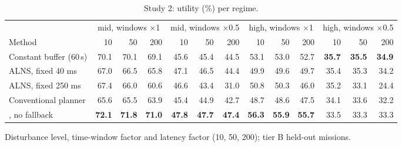 \begin{table}[t]
\caption{Study 2: utility (\%) per regime.}\label{tab:s2regime}
\centering\footnotesize
\setlength{\tabcolsep}{2.2pt}
\begin{threeparttable}
\begin{tabular}{lrrrrrrrrrrrr}
\toprule
 & \multicolumn{3}{c}{mid, windows $\times$1} & \multicolumn{3}{c}{mid, windows $\times$0.5} & \multicolumn{3}{c}{high, windows $\times$1} & \multicolumn{3}{c}{high, windows $\times$0.5} \\
\cmidrule(lr){2-4}\cmidrule(lr){5-7}\cmidrule(lr){8-10}\cmidrule(lr){11-13}
Method & 10 & 50 & 200 & 10 & 50 & 200 & 10 & 50 & 200 & 10 & 50 & 200 \\
\midrule
Constant buffer (60\,s) & 70.1 & 70.1 & 69.1 & 45.6 & 45.4 & 44.5 & 53.1 & 53.0 & 52.7 & \textbf{35.7} & \textbf{35.5} & \textbf{34.9} \\
ALNS, fixed 40 ms & 67.0 & 66.5 & 65.8 & 47.1 & 46.5 & 44.4 & 49.9 & 49.6 & 49.7 & 35.4 & 35.3 & 34.2 \\
ALNS, fixed 250 ms & 67.4 & 66.0 & 60.6 & 46.6 & 43.4 & 31.0 & 50.8 & 50.3 & 46.0 & 35.2 & 33.1 & 24.4 \\
Conventional planner & 65.6 & 65.5 & 63.9 & 45.4 & 44.9 & 42.7 & 48.7 & 48.6 & 47.5 & 34.1 & 33.6 & 32.2 \\
\mname{}, no fallback & \textbf{72.1} & \textbf{71.8} & \textbf{71.0} & \textbf{47.8} & \textbf{47.7} & \textbf{47.4} & \textbf{56.3} & \textbf{55.9} & \textbf{55.7} & 33.5 & 33.3 & 33.3 \\
\bottomrule
\end{tabular}
\begin{tablenotes}[flushleft]\scriptsize
\item[] Disturbance level, time-window factor and latency factor (10, 50, 200); tier B held-out missions.
\end{tablenotes}
\end{threeparttable}
\end{table}
